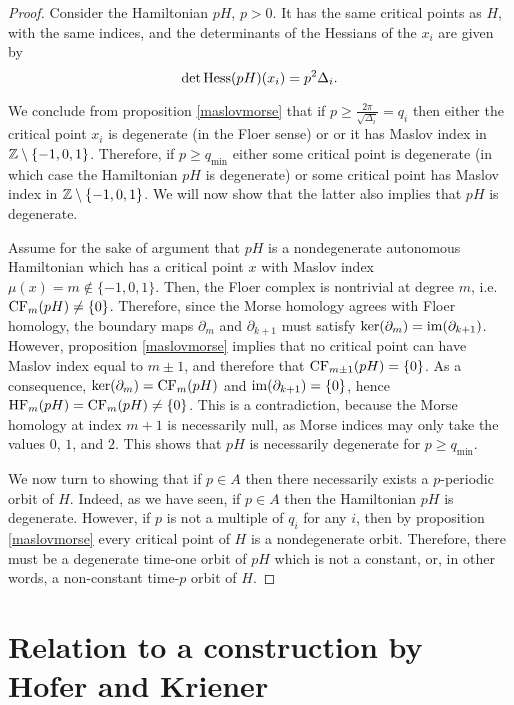 \begin{proof}
Consider the Hamiltonian $p H$, $p > 0$. It has the same critical points as $H$, with the same indices, and the determinants of the Hessians of the $x_i$ are given by
\begin{equation}
\det \operatorname{Hess}(pH)(x_i) = p^2 \Delta_i.
\end{equation}

We conclude from proposition \ref{maslovmorse} that if $p \geq \frac{2\pi}{\sqrt{\Delta_i}} = q_i$ then either the critical point $x_i$ is degenerate (in the Floer sense) or or it has Maslov index in $\mathbb{Z} \setminus \{-1,0,1\}$. Therefore, if $p \geq q_{\min}$ either some critical point is degenerate (in which case the Hamiltonian $pH$ is degenerate) or some critical point has Maslov index in $\mathbb{Z} \setminus \{-1,0,1\}$. We will now show that the latter also implies that $pH$ is degenerate.

Assume for the sake of argument that $pH$ is a nondegenerate autonomous Hamiltonian which has a critical point $x$ with Maslov index $\mu(x) = m \not \in \{-1,0,1\}$. Then, the Floer complex is nontrivial at degree $m$, i.e. $\mathrm{CF}_m(pH) \neq \{0\}$. Therefore, since the Morse homology agrees with Floer homology, the boundary maps $\partial_m$ and $\partial_{k+1}$ must satisfy $\ker(\partial_m) = \operatorname{im}(\partial_{k+1})$. However, proposition \ref{maslovmorse} implies that no critical point can have Maslov index equal to $m \pm 1$, and therefore that $\mathrm{CF}_{m\pm1}(pH) = \{0\}$. As a consequence, $\ker(\partial_m) = \mathrm{CF}_m(pH)$ and $\operatorname{im}(\partial_{k+1}) = \{0\}$, hence $\mathrm{HF}_m(pH) = \mathrm{CF}_m(pH) \neq \{0\}$. This is a contradiction, because the Morse homology at index $m+1$ is necessarily null, as Morse indices may only take the values $0$, $1$, and $2$. This shows that $pH$ is necessarily degenerate for $p \geq q_{\min}$.

\smallskip

We now turn to showing that if $p \in A$ then there necessarily exists a $p$-periodic orbit of $H$. Indeed, as we have seen, if $p \in A$ then the Hamiltonian $pH$ is degenerate. However, if $p$ is not a multiple of $q_i$ for any $i$, then by proposition \ref{maslovmorse} every critical point of $H$ is a nondegenerate orbit. Therefore, there must be a degenerate time-one orbit of $pH$ which is not a constant, or, in other words, a non-constant time-$p$ orbit of $H$.
\end{proof}

\section{Relation to a construction by Hofer and Kriener}\label{sec:hoferkriener}

